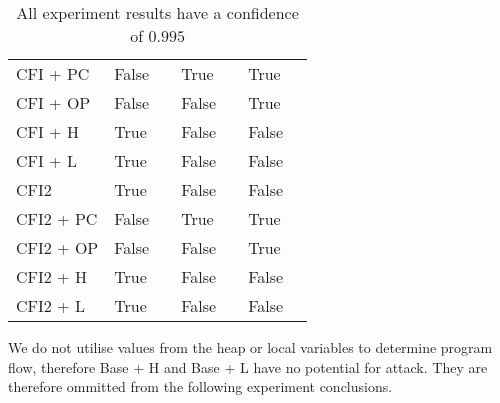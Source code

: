 \begin{table}[H]
\begin{tabular}{l|l|l|l|l|l|l}
    CFI + PC  & False & \relax[0.723, 0.733] & True & \relax[0.227, 0.237] & True & \relax[0.031, 0.041]   \\
    CFI + OP  & False & \relax[0.990, 1] & False & \relax[0, 0.01] & True & \relax[0,0.01]     \\
    CFI + H   & True &\relax[0.990, 1] & False & \relax[0, 0.01] & False & \relax[0, 0.01]    \\
    CFI + L   & True & \relax[0.990, 1] & False & \relax[0, 0.01] & False & \relax[0, 0.01]     \\
    CFI2       & True &\relax[0.990, 1] & False & \relax[0, 0.01] & False & \relax[0, 0.01]   \\
    CFI2 + PC  & False & \relax[0.782, 0.792] & True & \relax[0.183, 0.193] & True & \relax[0.021, 0.031]   \\
    CFI2 + OP  & False & \relax[0.990, 1] & False & \relax[0, 0.01] & True & \relax[0, 0.01]      \\
    CFI2 + H   & True &\relax[0.990, 1] & False & \relax[0, 0.01] & False & \relax[0, 0.01]    \\
    CFI2 + L   & True & \relax[0.990, 1] & False & \relax[0, 0.01] & False & \relax[0, 0.01] \\
    \end{tabular}
    \caption{All experiment results have a confidence of $0.995$}
\end{table}

\noindent We do not utilise values from the heap or local variables to determine program flow, therefore Base + H and Base + L have no potential for attack. They are therefore ommitted from the following experiment conclusions.